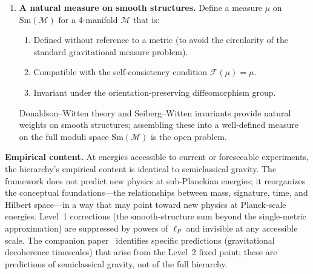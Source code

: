 \documentclass[12pt,a4paper]{article}
\theoremstyle{definition}
\theoremstyle{remark}
\begin{document}
\begin{enumerate}
\item \textbf{A natural measure on smooth structures.}
Define a measure $\mu$ on $\mathrm{Sm}(\mathcal{M})$ for a 4-manifold
$\mathcal{M}$ that is:
\begin{enumerate}
\item Defined without reference to a metric (to avoid the circularity of
the standard gravitational measure problem).
\item Compatible with the self-consistency condition
$\mathcal{F}(\mu) = \mu$.
\item Invariant under the orientation-preserving diffeomorphism group.
\end{enumerate}
Donaldson--Witten theory and Seiberg--Witten invariants provide natural
weights on smooth structures; assembling these into a well-defined
measure on the full moduli space $\mathrm{Sm}(\mathcal{M})$ is the open
problem.

\end{enumerate}

\medskip

\noindent\textbf{Empirical content.} At energies accessible to current
or foreseeable experiments, the hierarchy's empirical content is
identical to semiclassical gravity. The framework does not predict new
physics at sub-Planckian energies; it reorganizes the conceptual
foundations---the relationships between mass, signature, time, and
Hilbert space---in a way that may point toward new physics at Planck-scale
energies. Level~1 corrections (the smooth-structure sum beyond the
single-metric approximation) are suppressed by powers of $\ell_P$ and
invisible at any accessible scale. The companion
paper~\cite{fixed_point} identifies specific predictions (gravitational
decoherence timescales) that arise from the Level~2 fixed point; these
are predictions of semiclassical gravity, not of the full hierarchy.

\medskip
\end{document}
